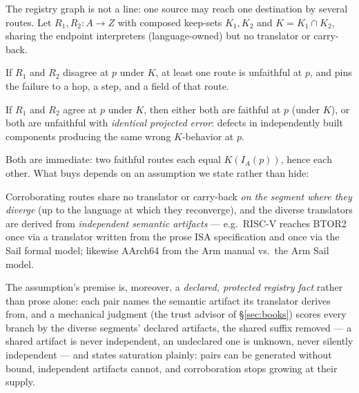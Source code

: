 The registry graph is not a line: one source may reach one destination by
several routes. Let $R_1, R_2 : A \to Z$ with composed keep-sets
$K_1, K_2$ and $K = K_1 \cap K_2$, sharing the endpoint interpreters
(language-owned) but no translator or carry-back.

\begin{lemma}
\label{lem:disagree}
If $R_1$ and $R_2$ disagree at $p$ under $K$, at least one route is
unfaithful at $p$, and  pins the failure to a hop,
a step, and a field of that route.
\end{lemma}

\begin{lemma}
\label{lem:agree}
If $R_1$ and $R_2$ agree at $p$ under $K$, then either both are faithful
at $p$ (under $K$), or both are unfaithful with \emph{identical projected
error}: defects in independently built components producing the same
wrong $K$-behavior at $p$.
\end{lemma}

Both are immediate: two faithful routes each equal $K(I_A(p))$, hence
each other. What  buys depends on an assumption we state
rather than hide:

\begin{assumption}[Diversity]
\label{asm:diversity}
Corroborating routes share no translator or carry-back \emph{on the
segment where they diverge} (up to the language at which they
reconverge), and the diverse translators are derived from
\emph{independent semantic artifacts} --- e.g.\ RISC-V reaches BTOR2
once via a translator written from the prose ISA specification and once
via the Sail formal model; likewise AArch64 from the Arm manual vs.\ the
Arm Sail model.
\end{assumption}

The assumption's premise is, moreover, a \emph{declared,
protected registry fact} rather than prose alone: each pair names the
semantic artifact its translator derives from, and a mechanical
judgment (the trust advisor of \S\ref{sec:books}) scores every branch
by the diverse segments' declared artifacts, the shared suffix
removed --- a shared artifact is never independent, an undeclared one
is unknown, never silently independent --- and states saturation
plainly: pairs can be generated without bound, independent artifacts
cannot, and corroboration stops growing at their supply.

